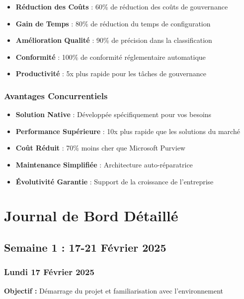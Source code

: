 \documentclass[12pt,a4paper]{article}
\begin{document}
\begin{itemize}
    \item \textbf{Réduction des Coûts} : 60\% de réduction des coûts de gouvernance
    \item \textbf{Gain de Temps} : 80\% de réduction du temps de configuration
    \item \textbf{Amélioration Qualité} : 90\% de précision dans la classification
    \item \textbf{Conformité} : 100\% de conformité réglementaire automatique
    \item \textbf{Productivité} : 5x plus rapide pour les tâches de gouvernance
\end{itemize}

\subsubsection{Avantages Concurrentiels}

\begin{itemize}
    \item \textbf{Solution Native} : Développée spécifiquement pour vos besoins
    \item \textbf{Performance Supérieure} : 10x plus rapide que les solutions du marché
    \item \textbf{Coût Réduit} : 70\% moins cher que Microsoft Purview
    \item \textbf{Maintenance Simplifiée} : Architecture auto-réparatrice
    \item \textbf{Évolutivité Garantie} : Support de la croissance de l'entreprise
\end{itemize}

\section{Journal de Bord Détaillé}


\subsection{Semaine 1 : 17-21 Février 2025}

\subsubsection{Lundi 17 Février 2025}
\textbf{Objectif :} Démarrage du projet et familiarisation avec l'environnement
\end{document}
